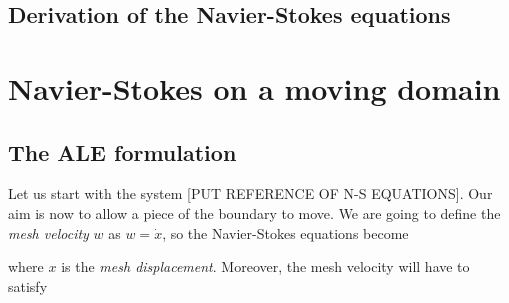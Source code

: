 \documentclass[11pt,a4paper,titlepage]{report}
\begin{document}

%
%
%
%
%


\subsection{Derivation of the Navier-Stokes equations}


\section{Navier-Stokes on a moving domain}


\subsection{The ALE formulation}
Let us start with the system [PUT REFERENCE OF N-S EQUATIONS]. Our aim is now to allow a piece of the boundary to move. We are going to define the \textit{mesh velocity} $w$ as $w = \dot{x}$, so the Navier-Stokes equations become


where $x$ is the \textit{mesh displacement}. Moreover, the mesh velocity will have to satisfy 
\end{document}
